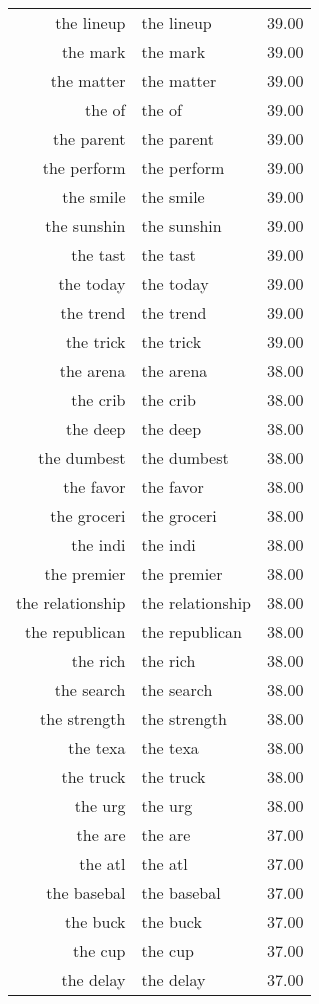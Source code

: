 \begin{table}[ht]
\begin{tabular}{rlr}
  the lineup & the lineup & 39.00 \\ 
  the mark & the mark & 39.00 \\ 
  the matter & the matter & 39.00 \\ 
  the of & the of & 39.00 \\ 
  the parent & the parent & 39.00 \\ 
  the perform & the perform & 39.00 \\ 
  the smile & the smile & 39.00 \\ 
  the sunshin & the sunshin & 39.00 \\ 
  the tast & the tast & 39.00 \\ 
  the today & the today & 39.00 \\ 
  the trend & the trend & 39.00 \\ 
  the trick & the trick & 39.00 \\ 
  the arena & the arena & 38.00 \\ 
  the crib & the crib & 38.00 \\ 
  the deep & the deep & 38.00 \\ 
  the dumbest & the dumbest & 38.00 \\ 
  the favor & the favor & 38.00 \\ 
  the groceri & the groceri & 38.00 \\ 
  the indi & the indi & 38.00 \\ 
  the premier & the premier & 38.00 \\ 
  the relationship & the relationship & 38.00 \\ 
  the republican & the republican & 38.00 \\ 
  the rich & the rich & 38.00 \\ 
  the search & the search & 38.00 \\ 
  the strength & the strength & 38.00 \\ 
  the texa & the texa & 38.00 \\ 
  the truck & the truck & 38.00 \\ 
  the urg & the urg & 38.00 \\ 
  the are & the are & 37.00 \\ 
  the atl & the atl & 37.00 \\ 
  the basebal & the basebal & 37.00 \\ 
  the buck & the buck & 37.00 \\ 
  the cup & the cup & 37.00 \\ 
  the delay & the delay & 37.00 \\ 

\end{tabular}
\end{table}
